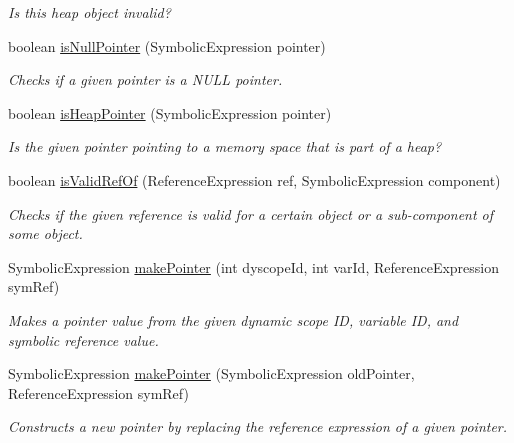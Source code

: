 \begin{DoxyCompactItemize}
\begin{DoxyCompactList}\small\item\em Is this heap object invalid? \end{DoxyCompactList}\item 
boolean \hyperlink{interfaceedu_1_1udel_1_1cis_1_1vsl_1_1civl_1_1dynamic_1_1IF_1_1SymbolicUtility_a6313c34bb13dd04e09b7db5934c5999e}{is\+Null\+Pointer} (Symbolic\+Expression pointer)
\begin{DoxyCompactList}\small\item\em Checks if a given pointer is a N\+U\+L\+L pointer. \end{DoxyCompactList}\item 
boolean \hyperlink{interfaceedu_1_1udel_1_1cis_1_1vsl_1_1civl_1_1dynamic_1_1IF_1_1SymbolicUtility_ad94b2ae8a01ad5ebbad94519543ef271}{is\+Heap\+Pointer} (Symbolic\+Expression pointer)
\begin{DoxyCompactList}\small\item\em Is the given pointer pointing to a memory space that is part of a heap? \end{DoxyCompactList}\item 
boolean \hyperlink{interfaceedu_1_1udel_1_1cis_1_1vsl_1_1civl_1_1dynamic_1_1IF_1_1SymbolicUtility_afd154afd83db373375a1792fa8f5d39a}{is\+Valid\+Ref\+Of} (Reference\+Expression ref, Symbolic\+Expression component)
\begin{DoxyCompactList}\small\item\em Checks if the given reference is valid for a certain object or a sub-\/component of some object. \end{DoxyCompactList}\item 
Symbolic\+Expression \hyperlink{interfaceedu_1_1udel_1_1cis_1_1vsl_1_1civl_1_1dynamic_1_1IF_1_1SymbolicUtility_a708c31ed4be7f16b4b7ae01786bf9227}{make\+Pointer} (int dyscope\+Id, int var\+Id, Reference\+Expression sym\+Ref)
\begin{DoxyCompactList}\small\item\em Makes a pointer value from the given dynamic scope I\+D, variable I\+D, and symbolic reference value. \end{DoxyCompactList}\item 
Symbolic\+Expression \hyperlink{interfaceedu_1_1udel_1_1cis_1_1vsl_1_1civl_1_1dynamic_1_1IF_1_1SymbolicUtility_a049588d60329e9a56a3bcd784aa03582}{make\+Pointer} (Symbolic\+Expression old\+Pointer, Reference\+Expression sym\+Ref)
\begin{DoxyCompactList}\small\item\em Constructs a new pointer by replacing the reference expression of a given pointer. \end{DoxyCompactList}\item 

\end{DoxyCompactItemize}
